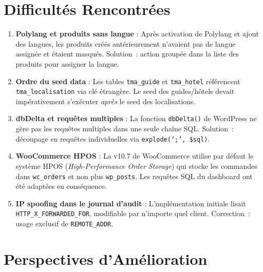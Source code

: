 \documentclass[12pt,a4paper]{report}
\begin{document}
\section{Difficult\'es Rencontr\'ees}

\begin{enumerate}
  \item \textbf{Polylang et produits sans langue} : Apr\`es activation de Polylang
        et ajout des langues, les produits cr\'e\'es ant\'erieurement n'avaient pas
        de langue assign\'ee et \'etaient masqu\'es. Solution~: action groupée
        dans la liste des produits pour assigner la langue.

  \item \textbf{Ordre du seed data} : Les tables \texttt{tma\_guide} et
        \texttt{tma\_hotel} r\'ef\'erencent \texttt{tma\_localisation} via cl\'e
        \'etrang\`ere. Le seed des guides/h\^otels devait imp\'erativement
        s'ex\'ecuter \textit{apr\`es} le seed des localisations.

  \item \textbf{dbDelta et requ\^etes multiples} : La fonction \texttt{dbDelta()}
        de WordPress ne g\`ere pas les requ\^etes multiples dans une seule cha\^ine
        SQL. Solution~: d\'ecoupage en requ\^etes individuelles via
        \texttt{explode(';', \$sql)}.

  \item \textbf{WooCommerce HPOS} : La v10.7 de WooCommerce utilise par d\'efaut
        le syst\`eme HPOS (\textit{High-Performance Order Storage}) qui stocke les
        commandes dans \texttt{wc\_orders} et non plus \texttt{wp\_posts}.
        Les requ\^etes SQL du dashboard ont \'et\'e adapt\'ees en cons\'equence.

  \item \textbf{IP spoofing dans le journal d'audit} : L'impl\'ementation initiale
        lisait \texttt{HTTP\_X\_FORWARDED\_FOR}, modifiable par n'importe quel
        client. Correction~: usage exclusif de \texttt{REMOTE\_ADDR}.
\end{enumerate}

\section{Perspectives d'Am\'elioration}
\end{document}
